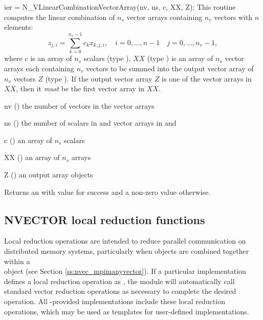 {
  ier = N\_VLinearCombinationVectorArray(nv, ns, c, XX, Z);
}
{
  This routine computes the linear combination of $n_s$ vector arrays containing
  $n_v$ vectors with $n$ elements:
  \begin{equation*}
  z_{j,i} = \sum_{k=0}^{n_s-1} c_k x_{k,j,i}, \quad i=0,\ldots,n-1 \quad j=0,\ldots,n_v-1,
  \end{equation*}
  where $c$ is an array of $n_s$ scalars (type ), $XX$
  (type ) is an array of $n_s$ vector arrays each containing $n_v$
  vectors to be summed into the output vector array of $n_v$ vectors $Z$ (type
  ). If the output vector array $Z$ is one of the vector arrays in
  $XX$, then it \textit{must} be the first vector array in $XX$.
}
{
 \begin{args}[nv]
  \item[nv] () the number of vectors in the vector arrays
  \item[ns] () the number of scalars in  and vector arrays
    in  and 
  \item[c] () an array of $n_s$ scalars
  \item[XX] () an array of $n_s$ {\nvector} arrays
  \item[Z] () an output array {\nvector} objects
  \end{args}
}
{
  Returns an  with value  for success and a non-zero value otherwise.
}
{}

\subsection{NVECTOR local reduction functions}\label{ss:nveclocalops}

Local reduction operations are intended to reduce parallel
communication on distributed memory systems, particularly when
{\nvector} objects are combined together within a \\
{\nvecmpimanyvector} object (see Section \ref{ss:nvec_mpimanyvector}).  If a
particular {\nvector} implementation defines a local reduction
operation as , the {\nvecmpimanyvector} module will
automatically call standard vector reduction operations as necessary
to complete the desired operation. All {\sundials}-provided {\nvector}
implementations include these local reduction operations, which may be
used as templates for user-defined {\nvector} implementations.


